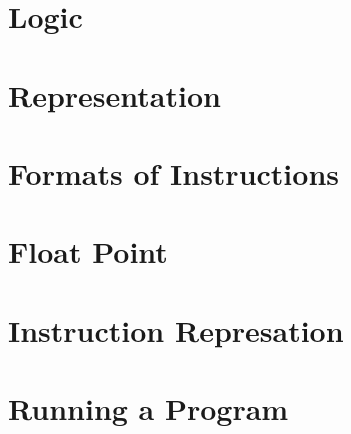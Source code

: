 \documentclass[en,11pt,english,black,simple,device=ppt]{elegantbook}
\begin{document}


\section{Logic}



\section{Representation}



\section{Formats of Instructions}



\section{Float Point}







\section{Instruction Represation}



\section{Running a Program}





\end{document}
